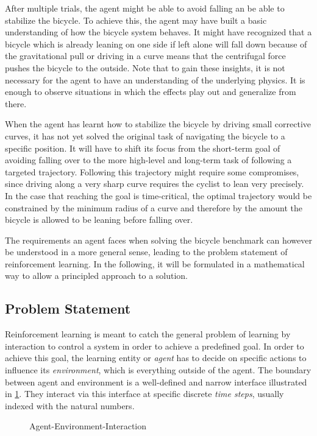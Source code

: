 After multiple trials, the agent might be able to avoid falling an be able to stabilize the bicycle.
To achieve this, the agent may have built a basic understanding of how the bicycle system behaves.
It might have recognized that a bicycle which is already leaning on one side if left alone will fall down because of the gravitational pull or driving in a curve means that the centrifugal force pushes the bicycle to the outside.
Note that to gain these insights, it is not necessary for the agent to have an understanding of the underlying physics.
It is enough to observe situations in which the effects play out and generalize from there.

When the agent has learnt how to stabilize the bicycle by driving small corrective curves, it has not yet solved the original task of navigating the bicycle to a specific position.
It will have to shift its focus from the short-term goal of avoiding falling over to the more high-level and long-term task of following a targeted trajectory.
Following this trajectory might require some compromises, since driving along a very sharp curve requires the cyclist to lean very precisely.
In the case that reaching the goal is time-critical, the optimal trajectory would be constrained by the minimum radius of a curve and therefore by the amount the bicycle is allowed to be leaning before falling over.

The requirements an agent faces when solving the bicycle benchmark can however be understood in a more general sense, leading to the problem statement of reinforcement learning.
In the following, it will be formulated in a mathematical way to allow a principled approach to a solution.

\subsection{Problem Statement}
\label{sub:problem_statement}
Reinforcement learning is meant to catch the general problem of learning by interaction to control a system in order to achieve a predefined goal.
In order to achieve this goal, the learning entity or \emph{agent} has to decide on specific actions to influence its \emph{environment}, which is everything outside of the agent.
The boundary between agent and environment is a well-defined and narrow interface illustrated in \cref{fig:agent_environment_interaction}.
They interact via this interface at specific discrete \emph{time steps}, usually indexed with the natural numbers.
\begin{figure}[htb]
    \centering
    \caption{Agent-Environment-Interaction}
    \label{fig:agent_environment_interaction}
\end{figure}

